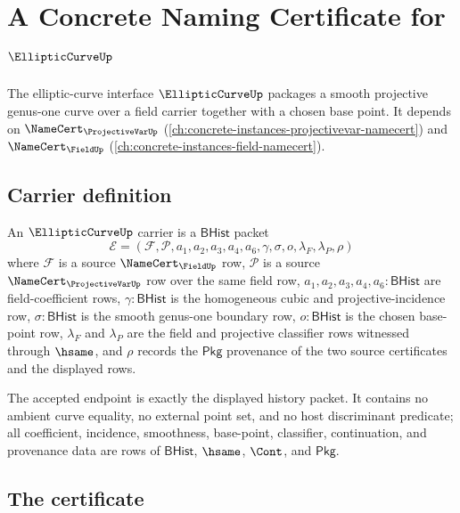 \chapter{A Concrete Naming Certificate for $\EllipticCurveUp$}
\label{ch:concrete-instances-ellipticcurve-namecert}

The elliptic-curve interface $\EllipticCurveUp$ packages a smooth projective genus-one curve over a field carrier together with a chosen base point. It depends on $\NameCert_{\ProjectiveVarUp}$ (\autoref{ch:concrete-instances-projectivevar-namecert}) and $\NameCert_{\FieldUp}$ (\autoref{ch:concrete-instances-field-namecert}).

\section{Carrier definition}
\label{sec:ellipticcurve-carrier}

\begin{definition}
\label{def:ellipticcurve-bhist-carrier-packet}
An $\EllipticCurveUp$ carrier is a $\mathsf{BHist}$ packet
$$
\mathcal{E}=(\mathcal{F},\mathcal{P},a_1,a_2,a_3,a_4,a_6,\gamma,\sigma,o,\lambda_F,\lambda_P,\rho)
$$
where $\mathcal{F}$ is a source $\NameCert_{\FieldUp}$ row, $\mathcal{P}$ is a source $\NameCert_{\ProjectiveVarUp}$ row over the same field row, $a_1,a_2,a_3,a_4,a_6:\mathsf{BHist}$ are field-coefficient rows, $\gamma:\mathsf{BHist}$ is the homogeneous cubic and projective-incidence row, $\sigma:\mathsf{BHist}$ is the smooth genus-one boundary row, $o:\mathsf{BHist}$ is the chosen base-point row, $\lambda_F$ and $\lambda_P$ are the field and projective classifier rows witnessed through $\hsame$, and $\rho$ records the $\mathsf{Pkg}$ provenance of the two source certificates and the displayed rows.

The accepted endpoint is exactly the displayed history packet. It contains no ambient curve equality, no external point set, and no host discriminant predicate; all coefficient, incidence, smoothness, base-point, classifier, continuation, and provenance data are rows of $\mathsf{BHist}$, $\hsame$, $\Cont$, and $\mathsf{Pkg}$.
\end{definition}

\section{The certificate}
\label{sec:ellipticcurve-certificate}


